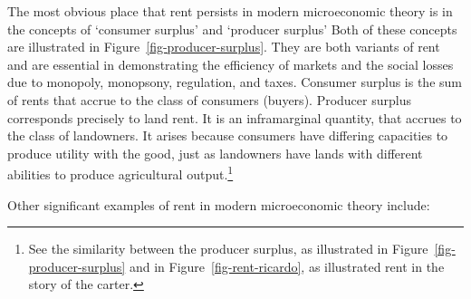 The most obvious place that rent persists in modern microeconomic theory is in the concepts of `\gls{consumer surplus}' and `\gls{producer surplus}'  Both of these concepts are illustrated in Figure~\ref{fig-producer-surplus}. They are both variants of rent and are essential in demonstrating the efficiency of markets and the social losses due to \gls{monopoly}, \gls{monopsony}, regulation, and taxes. Consumer surplus is the sum of rents that accrue to the class of consumers (buyers). Producer surplus corresponds precisely to land rent. It is an \gls{inframarginal} quantity, that accrues to the class of landowners. It arises because consumers have differing capacities to produce utility with the good, just as landowners have lands with different abilities to produce agricultural output.\footnote{See the similarity between the \gls{producer surplus}, as illustrated in Figure~\ref{fig-producer-surplus} and in Figure~\ref{fig-rent-ricardo}, as illustrated \gls{rent} in the story of the carter.}

Other significant examples of rent in modern microeconomic theory include: 

